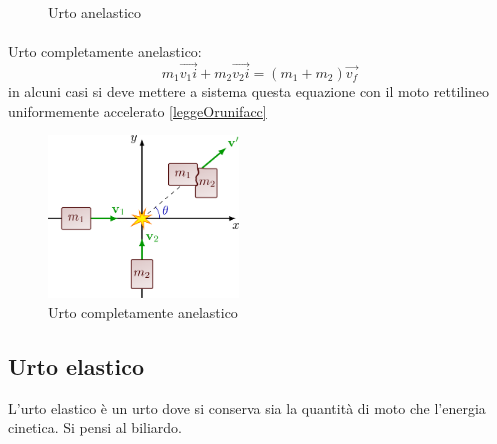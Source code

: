 \begin{figure}[H]
    \centering
    \def\w{0.8} %
    \def\h{0.5} %
    \def\v{0.7} %
    \def\L{4.6} %
    \caption{Urto anelastico}
    \label{fig:UrtoAnelastico}
\end{figure}

\paragraph{}
 Urto completamente anelastico:
\begin{equation}
    m_1\vec{v_1i} + m_2\vec{v_2i} = (m_1+ m_2)\vec{v_f}
\end{equation}
in alcuni casi si deve mettere a sistema questa equazione con il moto rettilineo uniformemente accelerato \ref{leggeOrunifacc}

 \begin{figure}[H]
     \centering
     \includegraphics[width = 0.45\textwidth]{image/urtoAnelastico.png}
     \caption{Urto completamente anelastico}
     \label{fig:urtocompletamenteAnelastico}
 \end{figure}
 
\subsection{Urto elastico}
L’urto elastico è un urto dove si conserva sia la quantità di moto che l’energia cinetica. Si pensi al biliardo.

